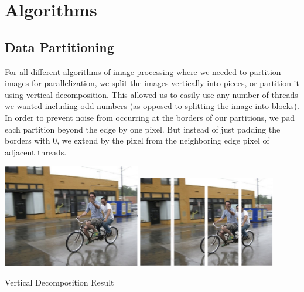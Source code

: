 \documentclass{article}
\begin{document}
\section{Algorithms}
    \subsection{Data Partitioning}
        For all different algorithms of image processing where we needed to partition images for parallelization, we split the images vertically into pieces, or partition it using vertical decomposition. This allowed us to easily use any number of threads we wanted including odd numbers (as opposed to splitting the image into blocks). In order to prevent noise from occurring at the borders of our partitions, we pad each partition beyond the edge by one pixel. But instead of just padding the borders with 0, we extend by the pixel from the neighboring edge pixel of adjacent threads.
        \begin{center}
        \includegraphics[width=0.45\textwidth]{source/images/vert-before.jpg}
        \includegraphics[width=0.45\textwidth]{source/images/vert-after.jpg}
        
        \caption{Vertical Decomposition Result}
        \end{center}
        
\end{document}
